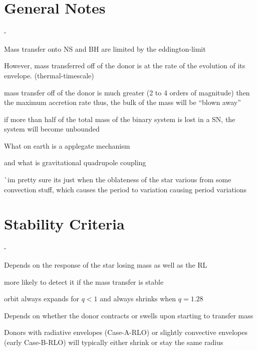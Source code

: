 \section{General Notes}
\begin{list}{-}{}
\item Mass transfer onto NS and BH are limited by the \gls{eddington-limit}
\item However, mass transferred off of the donor is at the rate of the evolution of its envelope. (\gls{thermal-timescale})
\item mass transfer off of the donor is much greater (2 to 4 orders of magnitude) then the maximum accretion rate thus, the bulk of the mass will be ``blown away''
\item if more than half of the total mass of the binary system is lost in a SN, the system will become unbounded 
\item What on earth is a applegate mechanism
\item and what is gravitational quadrupole coupling
\item ^^ im pretty sure its just when the oblateness of the star various from some convection stuff, which causes the period to variation causing period variations 
\end{list}

\section{Stability Criteria}
\begin{list}{-}{}
\item Depends on the response of the star losing mass as well as the RL
\item more likely to detect it if the mass transfer is stable 
\item orbit always expands for \(q < 1 \) and always shrinks when \(q = 1.28\)
\item Depends on whether the donor contracts or swells upon starting to transfer mass
\item Donors with radiative envelopes (\gls{Case-A-RLO}) or slightly convective envelopes (early \gls{Case-B-RLO}) will typically either shrink or stay the same radius
\item 
\end{list}

